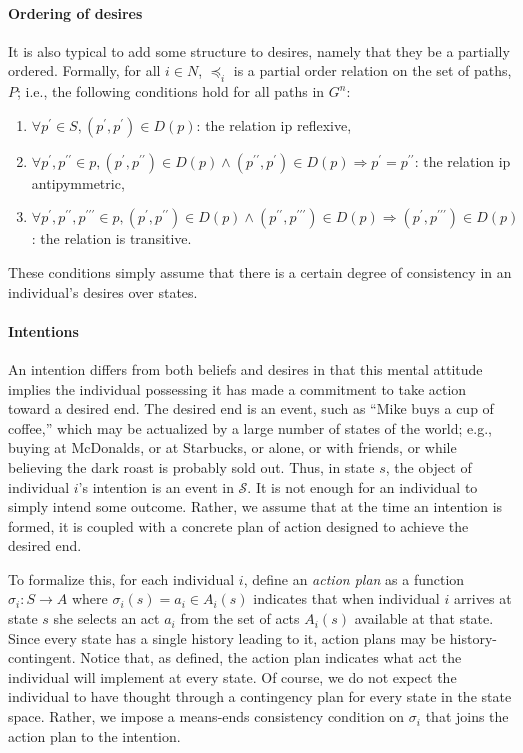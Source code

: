\documentclass[
11pt,
titlepage,
reqno,
]{article}%
\theoremstyle{definition}
\begin{document}
	\paragraph{Ordering of desires \label{para: desire ordering}} 
	It is also typical to add some structure to desires, namely that they be a partially ordered. 
	Formally, for all $i\in N$, $\preceq_i$ is a partial order relation on the set of paths, $P$; i.e., the following conditions hold for all paths in $G^n$:
	\begin{enumerate}
		\item $\forall  p^\prime\in S, (p^\prime,p^\prime)\in D(p)$: the relation ip reflexive,
		\item $\forall  p^\prime,p^{\prime\prime}\in p,(p^\prime,p^{\prime\prime})\in D(p)\wedge (p^{\prime\prime},p^\prime)\in D(p)\Rightarrow p^\prime=p^{\prime\prime}$: the relation ip antipymmetric,
		\item $\forall  p^\prime, p^{\prime\prime}, p^{\prime\prime\prime}\in p, (p^\prime,p^{\prime\prime})\in D(p)\wedge (p^{\prime\prime},p^{\prime\prime\prime})\in D(p)\Rightarrow  (p^{\prime},p^{\prime\prime\prime})\in D(p)$: the relation is transitive.
	\end{enumerate} 
	These conditions simply assume that there is a certain degree of consistency in an individual's desires over states. 
	
	\paragraph{Intentions\label{para: intentons}} 
	An intention differs from both beliefs and desires in that this mental attitude implies the individual possessing it has made a commitment to take action toward a desired end. 
	The desired end is an event, such as ``Mike buys a cup of coffee,'' which may be actualized by a large number of states of the world; e.g., buying at McDonalds, or at Starbucks, or alone, or with friends, or while believing the dark roast is probably sold out. Thus, in state $s$, the object of individual $i$'s intention is an event in $\mathcal{S}$. 
	It is not enough for an individual to simply intend some outcome. 
	Rather, we assume that at the time an intention is formed, it is coupled with a concrete plan of action designed to achieve the desired end. 
	
	To formalize this, for each individual $i$, define an \textit{action plan} as a function $\sigma_i:S\rightarrow A$ where $\sigma_i(s)=a_i\in A_i(s)$ indicates that when individual $i$ arrives at state $s$ she selects an act $a_i$ from the set of acts $A_i(s)$ available at that state. 
	Since every state has a single history leading to it, action plans may be history-contingent.
	Notice that, as defined, the action plan indicates what act the individual will implement at every state. 
	Of course, we do not expect the individual to have thought through a contingency plan for every state in the state space. 
	Rather, we impose a means-ends consistency condition on $\sigma_i$ that joins the action plan to the intention.
	
\end{document}
